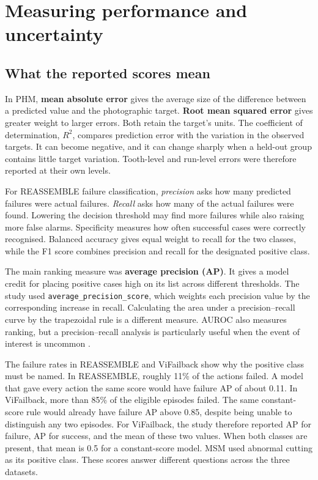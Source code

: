 \section{Measuring performance and uncertainty}
\label{sec:ch4-metrics}

\subsection{What the reported scores mean}

In PHM, \textbf{mean absolute error} gives the average size of the difference between a predicted value and the photographic target. \textbf{Root mean squared error} gives greater weight to larger errors. Both retain the target’s units. The coefficient of determination, \(R^2\), compares prediction error with the variation in the observed targets. It can become negative, and it can change sharply when a held-out group contains little target variation. Tooth-level and run-level errors were therefore reported at their own levels.

For REASSEMBLE failure classification, \emph{precision} asks how many predicted failures were actual failures. \emph{Recall} asks how many of the actual failures were found. Lowering the decision threshold may find more failures while also raising more false alarms. Specificity measures how often successful cases were correctly recognised. Balanced accuracy gives equal weight to recall for the two classes, while the F1 score combines precision and recall for the designated positive class.

The main ranking measure was \textbf{average precision (AP)}. It gives a model credit for placing positive cases high on its list across different thresholds. The study used \texttt{average\_precision\_score}, which weights each precision value by the corresponding increase in recall. Calculating the area under a precision–recall curve by the trapezoidal rule is a different measure. AUROC also measures ranking, but a precision–recall analysis is particularly useful when the event of interest is uncommon \parencite{Saito2015PrecisionRecall}.

The failure rates in REASSEMBLE and ViFailback show why the positive class must be named. In REASSEMBLE, roughly 11\% of the actions failed. A model that gave every action the same score would have failure AP of about 0.11. In ViFailback, more than 85\% of the eligible episodes failed. The same constant-score rule would already have failure AP above 0.85, despite being unable to distinguish any two episodes. For ViFailback, the study therefore reported AP for failure, AP for success, and the mean of these two values. When both classes are present, that mean is 0.5 for a constant-score model. MSM used abnormal cutting as its positive class. These scores answer different questions across the three datasets.

